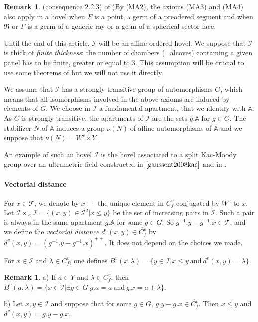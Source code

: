 \documentclass[12pt]{article}
\theoremstyle{plain}
\theoremstyle{definition}
\newtheorem{rque}[thm]{Remark}
\newcommand{\A}{\mathbb{A}}
\newcommand{\I}{\mathcal{I}}
\begin{document}
\begin{rque}(consequence 2.2.3) of \cite{rousseau2011masures})\label{rque axioms MA3 et MA4 modifiés}
By (MA2), the axioms (MA3) and (MA4) also apply in a hovel when $F$ is a point, a germ of a preodered segment and when $\mathfrak{R}$ or $F$ is a germ of a generic ray or a germ of a spherical sector face.
\end{rque}

\vspace{3mm}
Until the end of this article, $\I$ will be an affine ordered hovel. We suppose that $\I$ is thick of \textit{finite thickness}: the number of chambers (=alcoves) containing a given panel has to be finite, greater or equal to $3$. This assumption will be crucial to use some theorems of \cite{gaussent2014spherical} but we will not use it directly. 

We assume that $\I$ has a strongly transitive group of automorphisms $G$, which means that all isomorphisms involved in the above axioms are induced by elements of $G$. We choose in $\I$ a fundamental apartment, that we identify with $\A$. As $G$ is strongly transitive, the apartments of $\I$ are the sets $g.\A$ for $g\in G$. The stabilizer $N$ of $\A$ induces a group $\nu(N)$ of affine automorphisms of $\A$ and we suppose that $\nu(N)=W^v\ltimes Y$.

An example of such an hovel $\I$ is the hovel associated to a split Kac-Moody group over an ultrametric field constructed in $\cite{gaussent2008kac}$ and in \cite{rousseau2012almost}.

\paragraph{Vectorial distance}
For $x\in \mathcal{T}$, we denote by $x^{++}$ the unique element in $\overline{C^v_f}$ conjugated by $W^v$ to $x$. Let $\I\times_{\leq}\I=\{(x,y)\in \I^2|x\leq y\}$ be the set of increasing pairs in $\I$. Such a pair is always in the same apartment $g.\A$ for some $g\in G$. So $g^{-1}.y-g^{-1}.x\in \mathcal{T}$, and we define the \textit{vectorial distance} $d^v(x,y)\in\overline{C_f^v}$ by $d^v(x,y)=(g^{-1}.y-g^{-1}.x)^{++}$. It does not depend on the choices we made.

For $x\in \I$ and $\lambda\in \overline{C_f^v}$, one defines $B^v(x,\lambda)=\{y\in \I|x\leq y\mathrm{\ and\ }d^v(x,y)=\lambda\}$.

\begin{rque}\label{rque caractérisation distance vectorielle}
a) If $a\in Y$ and $\lambda\in \overline{C_f^v}$, then $B^v(a,\lambda)=\{x\in \I|\exists g\in G|g.a=a\mathrm{\ and\ }g.x=a+\lambda\}$.

b) Let $x,y\in \I$ and suppose that for some $g\in G$, $g.y-g.x\in \overline{C_f^v}$. Then $x\leq y$ and $d^v(x,y)=g.y-g.x$.
\end{rque}
\end{document}
